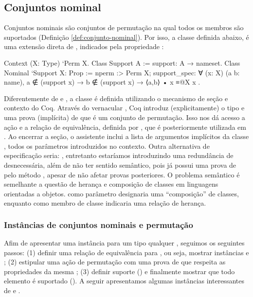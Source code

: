 \subsection{Conjuntos nominal}
Conjuntos nominais são conjuntos de permutação na qual todos os membros são suportados (Definição \ref{def:conjunto-nominal}). Por isso, a classe  definida abaixo, é uma extensão direta de , indicados pela propriedade :
\begin{coqcode}
Context (X: Type) `{Perm X}.
Class Support A := support: A → nameset.
Class Nominal `{Support X}: Prop := {
   nperm :> Perm X;
   support_spec: ∀ (x: X) (a b: name),
      a ∉ (support x) → b ∉ (support x) → ⟨a,b⟩ • x ≡@{X} x
}.
\end{coqcode}
Diferentemente de  e , a classe  é definida utilizando o mecanismo de seção e contexto do Coq. Através do vernacular , Coq introduz (explicitamente) o tipo  e uma prova (implícita) de que é um conjunto de permutação. Isso nos dá acesso a ação e a relação de equivalência, definida por , que é posteriormente utilizada em . Ao encerrar a seção, o assistente inclui a lista de argumentos implícitos da classe , todos os parâmetros introduzidos no contexto. Outra alternativa de especificação seria: , entretanto estaríamos introduzindo uma redundância de  desnecessária, além de não ter sentido semântico, pois  já possui uma prova de  pelo método , apesar de não afetar provas posteriores. O problema semântico é semelhante a questão de herança e composição de classes em linguagens orientadas a objetos.  como parâmetro designaria uma ``composição'' de classes, enquanto como membro de classe indicaria uma relação de herança.


\subsubsection{Instâncias de conjuntos nominais e permutação}
Afim de apresentar uma instância  para um tipo qualquer , seguimos os seguintes passos: (1) definir uma relação de equivalência para , ou seja, mostrar instâncias  e ; (2) estipular uma ação de permutação  com uma prova de que respeita as propriedades da mesma ; (3) definir suporte () e finalmente mostrar que todo elemento é suportado (). A seguir apresentamos algumas instâncias interessantes de  e  \cite{Urban2008}.

